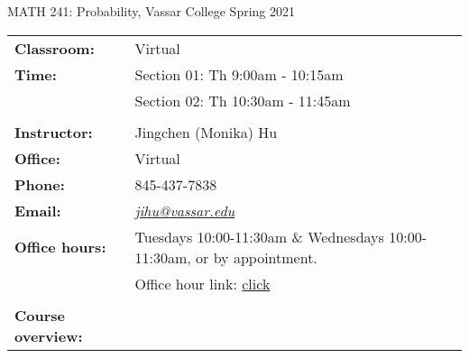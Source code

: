 \documentclass[11pt]{article}
\newcommand{\pl}[1]{\textcolor{Regalia}{\textbf{#1}}}
\begin{document}
MATH 241: Probability, Vassar College \hfill
Spring 2021 \\






\begin{center}
\begin{tabular}{ p{3.2cm} p{14cm} }
\pl{Classroom:}		& Virtual \\
\pl{Time:}			& Section 01: Th 9:00am - 10:15am \\
				& Section 02: Th 10:30am - 11:45am \\
					& \\
\pl{Instructor:}		& Jingchen (Monika) Hu \\
\pl{Office:}			& Virtual \\
\pl{Phone:}			& 845-437-7838\\
\pl{Email:}			& \href{mailto:jihu@vassar.edu}{\textit{jihu@vassar.edu}} \\
\pl{Office hours:}		& Tuesdays 10:00-11:30am \& Wednesdays 10:00-11:30am, or by appointment. \\
					& Office hour link: \href{https://vassar.zoom.us/j/94170301450?pwd=WTNmV3JYOHNBMXRYcEZFUmFsVWQwUT09}{click} \\
					&\\
\pl{Course \hspace{0.8cm} overview:}			&


\end{tabular}
\end{center}
\end{document}
